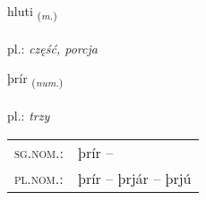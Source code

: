\documentclass[frontgrid, backgrid]{flacards}\usepackage[]{graphicx}\usepackage[]{xcolor}
\begin{document}
\renewcommand{\flhead}{\vskip5pt \fboxsep=0pt {\small\bfseries\footnotesize Nafnorð | rzeczownik}}
\renewcommand{\fcfoot}{\vskip5pt \fboxsep=0pt \hspace{2pt}{\small\bfseries\footnotesize 1K}}

\renewcommand{\blhead}{\vskip5pt {\small\bfseries\footnotesize Nafnorð | rzeczownik }}
\renewcommand{\bcfoot}{\vskip5pt \hspace{2pt}{\small\bfseries\footnotesize 1K}}


{hluti \small{\textsubscript{(\textit{m.})}} \\[1ex] %
\textphonetic{[l̥ʏːtɪ]} \\
pl.: \emph{część, porcja} \\  [2ex]
\renewcommand*{\arraystretch}{0.8}
}

\renewcommand{\flhead}{\vskip5pt \fboxsep=0pt {\small\bfseries\footnotesize Töluorð | liczebnik}}
\renewcommand{\fcfoot}{\vskip5pt \fboxsep=0pt \hspace{2pt}{\small\bfseries\footnotesize 1K}}

\renewcommand{\blhead}{\vskip5pt {\small\bfseries\footnotesize Töluorð | liczebnik }}
\renewcommand{\bcfoot}{\vskip5pt \hspace{2pt}{\small\bfseries\footnotesize 1K}}


{þrír \small{\textsubscript{(\textit{num.})}} \\[1ex] %
\textphonetic{[θriːr]} \\
pl.: \emph{trzy} \\  [2ex]
\renewcommand*{\arraystretch}{0.8}
\begin{tabular}{ll}
\textsc{sg.nom.}: & þrír  -- \\ 
\textsc{pl.nom.}: & þrír -- þrjár -- þrjú
\end{tabular}
}
\end{document}
